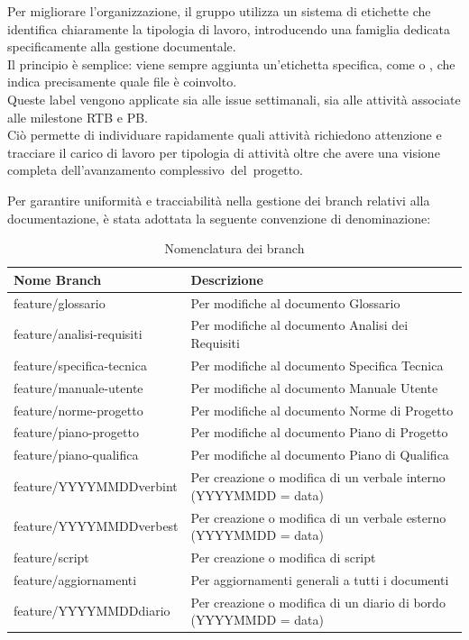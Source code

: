 Per migliorare l'organizzazione, il gruppo utilizza un sistema di etichette che identifica chiaramente la tipologia di lavoro, introducendo una famiglia dedicata specificamente alla gestione documentale.\\
Il principio è semplice: viene sempre aggiunta un'etichetta specifica, come  o , che indica precisamente quale file è coinvolto.\\
Queste label vengono applicate sia alle issue settimanali, sia alle attività associate alle milestone RTB e PB.\\
Ciò permette di individuare rapidamente quali attività richiedono attenzione e tracciare il carico di lavoro per tipologia di attività oltre che avere una visione completa dell'avanzamento complessivo del progetto.

\label{sec: nomenclatura-branch}
Per garantire uniformità e tracciabilità nella gestione dei branch relativi alla documentazione, è stata adottata la seguente convenzione di denominazione:
\begin{table}[H]
    \centering
    \renewcommand{\arraystretch}{1.15}
    \begin{tabular}{|p{}|p{}|}
        \hline
        \textbf{Nome Branch} & \textbf{Descrizione} \\
        \hline
        feature/glossario & Per modifiche al documento Glossario \\
        \hline
        feature/analisi-requisiti & Per modifiche al documento Analisi dei Requisiti \\
        \hline
        feature/specifica-tecnica & Per modifiche al documento Specifica Tecnica \\
        \hline
        feature/manuale-utente & Per modifiche al documento Manuale Utente \\
        \hline
        feature/norme-progetto & Per modifiche al documento Norme di Progetto \\
        \hline
        feature/piano-progetto & Per modifiche al documento Piano di Progetto \\
        \hline
        feature/piano-qualifica & Per modifiche al documento Piano di Qualifica\\
        \hline
        feature/YYYYMMDDverbint & Per creazione o modifica di un verbale interno (YYYYMMDD = data) \\
        \hline
        feature/YYYYMMDDverbest & Per creazione o modifica di un verbale esterno (YYYYMMDD = data) \\
        \hline
        feature/script & Per creazione o modifica di script \\
        \hline
        feature/aggiornamenti & Per aggiornamenti generali a tutti i documenti \\
        \hline
        feature/YYYYMMDDdiario & Per creazione o modifica di un diario di bordo (YYYYMMDD = data) \\
        \hline
    \end{tabular}
    \caption{Nomenclatura dei branch}
\end{table}


